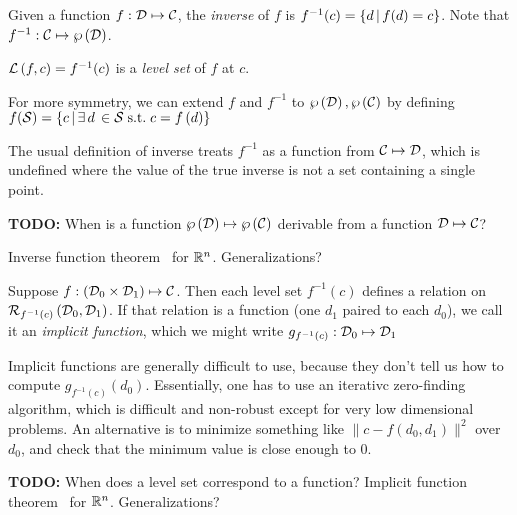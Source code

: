\label{sec:Inverses-and-pseudo-inverses}

Given a function $f : \mathcal{D} \mapsto \mathcal{C}$,
the \textit{inverse} of $f$ is 
$f^{-1}(c) =  \left\{ d \, | \, f(d) = c \right\} $.
Note that $f^{-1} : \mathcal{C}  \mapsto  \wp \left( \mathcal{D} \right) $.

$\mathcal{L}\left( f , c \right) = f^{-1}(c)$ is a \textit{level set} of
$f$ at $c$.

For more symmetry, we can extend $f$ and $f^{-1}$ to 
$ \wp \left( \mathcal{D} \right)   ,  \wp \left( \mathcal{C} \right) $
by defining
$f(\mathcal{S}) = 
 \left\{ c \, | \, \exists \, d \, \in \mathcal{S} \; \text{s.t.} \; c = f \left( d \right) \right\} $

The usual definition of inverse treats $f^{-1}$
as a function from $\mathcal{C} \mapsto \mathcal{D}$,
which is undefined where the value of the true
inverse is not a set containing a single point.

\textbf{TODO:} When is a function 
$ \wp \left( \mathcal{D} \right)   \mapsto  \wp \left( \mathcal{C} \right) $
derivable from a function $\mathcal{D} \mapsto \mathcal{C}$?

Inverse function theorem~\cite[][Theorem 2-1]{spivak-1965}
for $\mathbb{R}^n$. 
Generalizations?~\cite{wiki:Inverse-function-theorem}

\label{sec:Implicit-functions}

Suppose 
$f : \left( \mathcal{D}_0 \times \mathcal{D}_1 \right) \mapsto \mathcal{C}$.
Then each level set $f^{-1}\left( c \right)$ defines a relation on 
$\mathcal{R}_{f^{-1}(c)} \left( \mathcal{D}_0 , \mathcal{D}_1 \right)$.
If that relation is a function
(one $d_1$ paired to each $d_0$),
we call it an \textit{implicit function},
which we might write $g_{f^{-1}(c)} : \mathcal{D}_0 \mapsto \mathcal{D}_1$

Implicit functions are generally difficult to use,
because they don't tell us how to compute 
$g_{f^{-1}(c)} \left( d_0 \right)$.
Essentially, one has to use an iterativc zero-finding 
algorithm, which is difficult and non-robust except
for very low dimensional problems.
An alternative is to minimize something like
$\| c - f\left( d_0, d_1 \right) \|^2$ over $d_0$,
and check that the minimum value is close enough to $0$.

\textbf{TODO:} When does a level set correspond to a function?
Implicit function theorem~\cite[][Theorem 2-2]{spivak-1965}
for $\mathbb{R}^n$. 
Generalizations?~\cite{wiki:Implicit-function-theorem,
wiki:Inverse-function-theorem}

